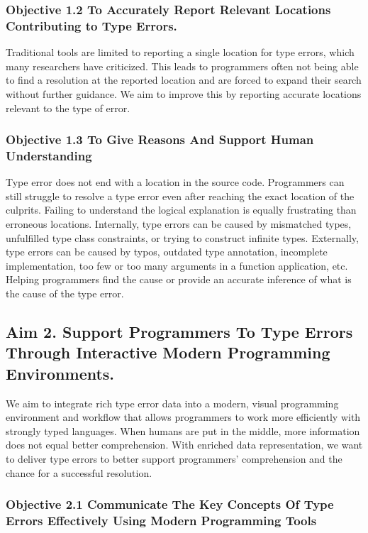 \subsubsection{Objective 1.2 To Accurately Report Relevant Locations Contributing to Type Errors.}
Traditional tools are limited to reporting a single location for type errors, which many researchers have criticized. This leads to programmers often not being able to find a resolution at the reported location and are forced to expand their search without further guidance. We aim to improve this by reporting accurate locations relevant to the type of error.

\subsubsection{Objective 1.3 To Give Reasons And Support Human Understanding}
Type error does not end with a location in the source code. Programmers can still struggle to resolve a type error even after reaching the exact location of the culprits. Failing to understand the logical explanation is equally frustrating than erroneous locations. Internally, type errors can be caused by mismatched types, unfulfilled type class constraints, or trying to construct infinite types. Externally, type errors can be caused by typos, outdated type annotation, incomplete implementation, too few or too many arguments in a function application, etc. Helping programmers find the cause or provide an accurate inference of what is the cause of the type error.


\subsection{Aim 2. Support Programmers To Type Errors Through Interactive Modern Programming Environments.}

We aim to integrate rich type error data into a modern, visual programming environment and workflow that allows programmers to work more efficiently with strongly typed languages. When humans are put in the middle, more information does not equal better comprehension. With enriched data representation, we want to deliver type errors to better support programmers’ comprehension and the chance for a successful resolution.

\subsubsection{Objective 2.1 Communicate The Key Concepts Of Type Errors Effectively Using Modern Programming Tools}

